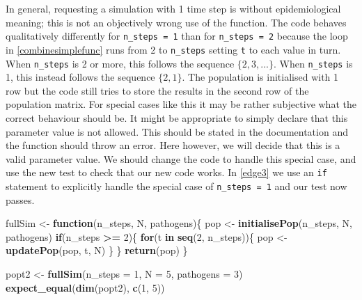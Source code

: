 \documentclass[]{elsarticle} %
\newenvironment{Shaded}{\begin{snugshade}}{\end{snugshade}}
\newcommand{\ControlFlowTok}[1]{\textcolor[rgb]{0.13,0.29,0.53}{\textbf{#1}}}
\newcommand{\DataTypeTok}[1]{\textcolor[rgb]{0.13,0.29,0.53}{#1}}
\newcommand{\DecValTok}[1]{\textcolor[rgb]{0.00,0.00,0.81}{#1}}
\newcommand{\KeywordTok}[1]{\textcolor[rgb]{0.13,0.29,0.53}{\textbf{#1}}}
\newcommand{\NormalTok}[1]{#1}
\newcommand{\OperatorTok}[1]{\textcolor[rgb]{0.81,0.36,0.00}{\textbf{#1}}}
\newcommand{\StringTok}[1]{\textcolor[rgb]{0.31,0.60,0.02}{#1}}
\begin{document}
In general, requesting a simulation with 1 time step is without epidemiological meaning; this is not an objectively wrong use of the function.
The code behaves qualitatively differently for \texttt{n\_steps\ =\ 1} than for \texttt{n\_steps\ =\ 2} because the loop in \ref{combinesimplefunc} runs from 2 to \texttt{n\_steps} setting \texttt{t} to each value in turn.
When \texttt{n\_steps} is 2 or more, this follows the sequence \(\{2, 3, ...\}\).
When \texttt{n\_steps} is 1, this instead follows the sequence \(\{2, 1\}\).
The population is initialised with 1 row but the code still tries to store the results in the second row of the population matrix.
For special cases like this it may be rather subjective what the correct behaviour should be.
It might be appropriate to simply declare that this parameter value is not allowed.
This should be stated in the documentation and the function should throw an error.
Here however, we will decide that this is a valid parameter value.
We should change the code to handle this special case, and use the new test to check that our new code works.
In \ref{edge3} we use an \texttt{if} statement to explicitly handle the special case of \texttt{n\_steps\ =\ 1} and our test now passes.
\newline
{}\label{edge3}

\begin{Shaded}
\begin{Highlighting}[]
\NormalTok{fullSim <-}\StringTok{ }\ControlFlowTok{function}\NormalTok{(n_steps, N, pathogens)\{}
\NormalTok{  pop <-}\StringTok{ }\KeywordTok{initialisePop}\NormalTok{(n_steps, N, pathogens) }
  \ControlFlowTok{if}\NormalTok{(n_steps }\OperatorTok{>=}\StringTok{ }\DecValTok{2}\NormalTok{)\{}
    \ControlFlowTok{for}\NormalTok{(t }\ControlFlowTok{in} \KeywordTok{seq}\NormalTok{(}\DecValTok{2}\NormalTok{, n_steps))\{}
\NormalTok{      pop <-}\StringTok{ }\KeywordTok{updatePop}\NormalTok{(pop, t, N)}
\NormalTok{    \}}
\NormalTok{  \}}
  \KeywordTok{return}\NormalTok{(pop)}
\NormalTok{\}}

\NormalTok{popt2 <-}\StringTok{ }\KeywordTok{fullSim}\NormalTok{(}\DataTypeTok{n_steps =} \DecValTok{1}\NormalTok{, }\DataTypeTok{N =} \DecValTok{5}\NormalTok{, }\DataTypeTok{pathogens =} \DecValTok{3}\NormalTok{)}
\KeywordTok{expect_equal}\NormalTok{(}\KeywordTok{dim}\NormalTok{(popt2), }\KeywordTok{c}\NormalTok{(}\DecValTok{1}\NormalTok{, }\DecValTok{5}\NormalTok{))}
\end{Highlighting}
\end{Shaded}
\end{document}
